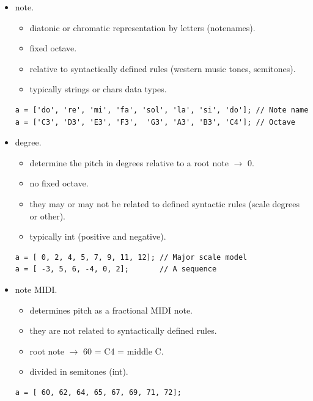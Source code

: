 \begin{itemize}
\tightlist
\item note.
  \begin{itemize}
  \tightlist
  \item diatonic or chromatic representation by letters (notenames).
  \item fixed octave.
  \item relative to syntactically defined rules (western music tones, semitones).
  \item typically strings or chars data types.
  \end{itemize}

\begin{lstlisting}[frame=single] 
a = ['do', 're', 'mi', 'fa', 'sol', 'la', 'si', 'do']; // Note name
a = ['C3', 'D3', 'E3', 'F3',  'G3', 'A3', 'B3', 'C4']; // Octave
\end{lstlisting}

\item degree.

  \begin{itemize}
  \tightlist
  \item determine the pitch in degrees relative to a root note \(\rightarrow\) 0.
  \item no fixed octave.
  \item they may or may not be related to defined syntactic rules (scale degrees or other).
  \item typically int (positive and negative).
  \end{itemize}

\begin{lstlisting}[frame=single] 
a = [ 0, 2, 4, 5, 7, 9, 11, 12]; // Major scale model
a = [ -3, 5, 6, -4, 0, 2];       // A sequence 
\end{lstlisting}

\item note MIDI.
  \begin{itemize}
  \tightlist
  \item determines pitch as a fractional MIDI note.
  \item they are not related to syntactically defined rules.
  \item root note \(\rightarrow\) 60 = C4 = middle C.
  \item divided in semitones (int).
  \end{itemize}

\begin{lstlisting}[frame=single] 
a = [ 60, 62, 64, 65, 67, 69, 71, 72];
\end{lstlisting}


\end{itemize}
